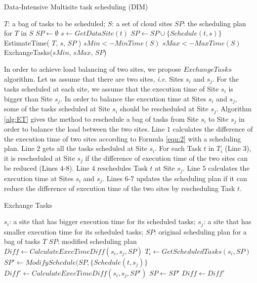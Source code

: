 \linespread{1.0}
\begin{algorithm}
\caption{Data-Intensive Multisite task scheduling (DIM)}\label{alg:DIMTS}
\begin{algorithmic}[1]
\INPUT $T$: a bag of tasks to be scheduled; $S$: a set of cloud sites
\OUTPUT $SP$: the scheduling plan for $T$ in $S$
\State $SP\gets \emptyset$
\State $s\gets GetDataSite( t )$  
\State $SP \gets SP \cup \{ Schedule(t, s) \}$
\State EstimateTime( $T$, $s$, $SP$ )
\EndFor
{}
\State $sMin <- MinTime(S)$ 
\State $sMax <- MaxTime(S)$ 
\State ExchangeTasks($sMin$, $sMax$, $SP$) 
\EndWhile
\ENDBEGIN
\end{algorithmic}
\end{algorithm}

In order to achieve load balancing of two sites, we propose $ExchangeTasks$ algorithm. Let us assume that there are two sites, \textit{i.e.} Sites $s_i$ and $s_j$. For the tasks scheduled at each site, we assume that the execution time of Site $s_i$ is bigger than Site $s_j$. In order to balance the execution time at Sites $s_i$ and $s_j$, some of the tasks scheduled at Site $s_i$ should be rescheduled at Site $s_j$. Algorithm \ref{alg:ET} gives the method to reschedule a bag of tasks from Site $s_i$ to Site $s_j$ in order to balance the load between the two sites. Line $1$ calculates the difference of the execution time of two sites according to Formula \ref{equ:2} with a scheduling plan. Line $2$ gets all the tasks scheduled at Site $s_i$. For each Task $t$ in $T_i$ (Line $3$), it is rescheduled at Site $s_j$ if the difference of execution time of the two sites can be reduced (Lines $4$-$8$). Line $4$ reschedules Task $t$ at Site $s_j$. Line $5$ calculates the execution time at Sites $s_i$ and $s_j$. Lines $6$-$7$ updates the scheduling plan if it can reduce the difference of execution time of the two sites by rescheduling Task $t$. 


\begin{algorithm}
\caption{Exchange Tasks}\label{alg:ET}
\begin{algorithmic}[1]
\INPUT $s_i$: a site that has bigger execution time for its scheduled tasks; $s_j$: a site that has smaller execution time for its scheduled tasks; $SP$: original scheduling plan for a bag of tasks $T$
\OUTPUT $SP$: modified scheduling plan
\State $Diff \gets CalculateExecTimeDiff( s_i, s_j, SP )  $
\State $T_i\gets GetScheduledTasks( s_i, SP )$
\State $SP' \gets ModifySchedule( SP, \{Schedule(t, s_j)\}$ 
\State $Diff' \gets CalculateExecTimeDiff( s_i, s_j, SP' ) $
\State $SP\gets SP'$
\State $Diff\gets Diff'$
\EndIf
\EndFor
\ENDBEGIN
\end{algorithmic}
\end{algorithm}

